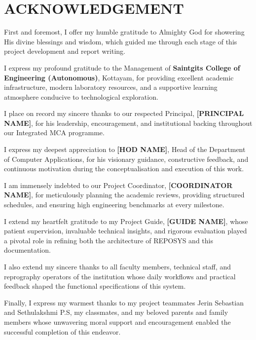 \documentclass[12pt,a4paper,oneside]{report}
\begin{document}
\chapter*{ACKNOWLEDGEMENT}
\begin{doublespace}
First and foremost, I offer my humble gratitude to Almighty God for showering His divine blessings and wisdom, which guided me through each stage of this project development and report writing.

I express my profound gratitude to the Management of \textbf{Saintgits College of Engineering (Autonomous)}, Kottayam, for providing excellent academic infrastructure, modern laboratory resources, and a supportive learning atmosphere conducive to technological exploration.

I place on record my sincere thanks to our respected Principal, \textbf{[PRINCIPAL NAME]}, for his leadership, encouragement, and institutional backing throughout our Integrated MCA programme.

I express my deepest appreciation to \textbf{[HOD NAME]}, Head of the Department of Computer Applications, for his visionary guidance, constructive feedback, and continuous motivation during the conceptualisation and execution of this work.

I am immensely indebted to our Project Coordinator, \textbf{[COORDINATOR NAME]}, for meticulously planning the academic reviews, providing structured schedules, and ensuring high engineering benchmarks at every milestone.

I extend my heartfelt gratitude to my Project Guide, \textbf{[GUIDE NAME]}, whose patient supervision, invaluable technical insights, and rigorous evaluation played a pivotal role in refining both the architecture of REPOSYS and this documentation.

I also extend my sincere thanks to all faculty members, technical staff, and reprography operators of the institution whose daily workflows and practical feedback shaped the functional specifications of this system.

Finally, I express my warmest thanks to my project teammates Jerin Sebastian and Sethulakshmi P.S, my classmates, and my beloved parents and family members whose unwavering moral support and encouragement enabled the successful completion of this endeavor.
\end{doublespace}

\clearpage

\end{document}
